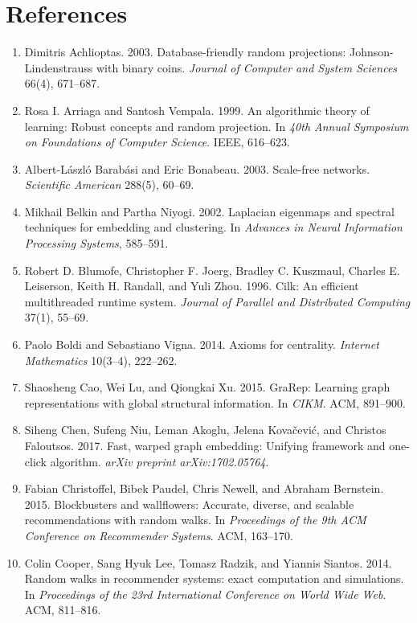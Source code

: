 \documentclass[11pt]{article}
\begin{document}
\section*{References}
\begin{enumerate}[leftmargin=1.5em]
    \item Dimitris Achlioptas. 2003. Database-friendly random projections: Johnson-Lindenstrauss with binary coins. \emph{Journal of Computer and System Sciences} 66(4), 671--687.
    \item Rosa I. Arriaga and Santosh Vempala. 1999. An algorithmic theory of learning: Robust concepts and random projection. In \emph{40th Annual Symposium on Foundations of Computer Science}. IEEE, 616--623.
    \item Albert-L\'aszl\'o Barab\'asi and Eric Bonabeau. 2003. Scale-free networks. \emph{Scientific American} 288(5), 60--69.
    \item Mikhail Belkin and Partha Niyogi. 2002. Laplacian eigenmaps and spectral techniques for embedding and clustering. In \emph{Advances in Neural Information Processing Systems}, 585--591.
    \item Robert D. Blumofe, Christopher F. Joerg, Bradley C. Kuszmaul, Charles E. Leiserson, Keith H. Randall, and Yuli Zhou. 1996. Cilk: An efficient multithreaded runtime system. \emph{Journal of Parallel and Distributed Computing} 37(1), 55--69.
    \item Paolo Boldi and Sebastiano Vigna. 2014. Axioms for centrality. \emph{Internet Mathematics} 10(3--4), 222--262.
    \item Shaosheng Cao, Wei Lu, and Qiongkai Xu. 2015. GraRep: Learning graph representations with global structural information. In \emph{CIKM}. ACM, 891--900.
    \item Siheng Chen, Sufeng Niu, Leman Akoglu, Jelena Kova\v{c}evi\'c, and Christos Faloutsos. 2017. Fast, warped graph embedding: Unifying framework and one-click algorithm. \emph{arXiv preprint arXiv:1702.05764}.
    \item Fabian Christoffel, Bibek Paudel, Chris Newell, and Abraham Bernstein. 2015. Blockbusters and wallflowers: Accurate, diverse, and scalable recommendations with random walks. In \emph{Proceedings of the 9th ACM Conference on Recommender Systems}. ACM, 163--170.
    \item Colin Cooper, Sang Hyuk Lee, Tomasz Radzik, and Yiannis Siantos. 2014. Random walks in recommender systems: exact computation and simulations. In \emph{Proceedings of the 23rd International Conference on World Wide Web}. ACM, 811--816.

\end{enumerate}
\end{document}
